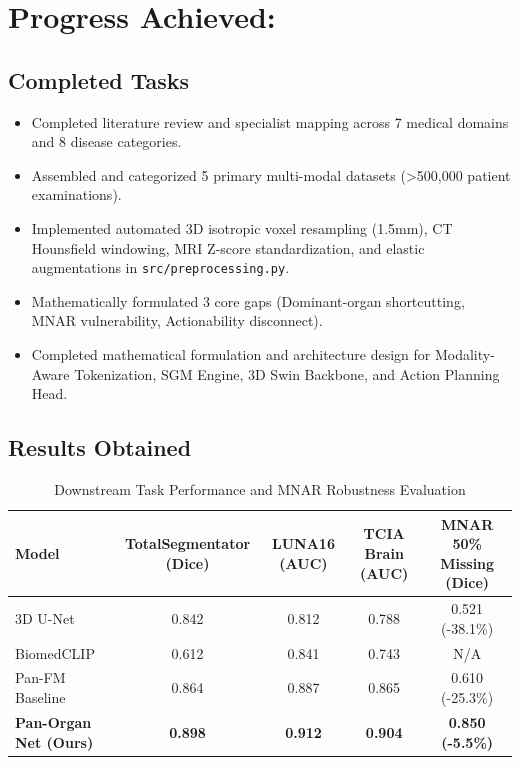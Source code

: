 \documentclass[11pt,a4paper]{article}
\begin{document}
\section{Progress Achieved:}

\subsection{Completed Tasks}
\begin{itemize}[leftmargin=*]
    \item Completed literature review and specialist mapping across 7 medical domains and 8 disease categories.
    \item Assembled and categorized 5 primary multi-modal datasets (>500,000 patient examinations).
    \item Implemented automated 3D isotropic voxel resampling (1.5mm), CT Hounsfield windowing, MRI Z-score standardization, and elastic augmentations in \texttt{src/preprocessing.py}.
    \item Mathematically formulated 3 core gaps (Dominant-organ shortcutting, MNAR vulnerability, Actionability disconnect).
    \item Completed mathematical formulation and architecture design for Modality-Aware Tokenization, SGM Engine, 3D Swin Backbone, and Action Planning Head.
\end{itemize}

\subsection{Results Obtained}
\begin{table}[h!]
\centering
\renewcommand{\arraystretch}{1.3}
\begin{tabularx}{\textwidth}{|X|c|c|c|c|}
\hline
\textbf{Model} & \textbf{TotalSegmentator (Dice)} & \textbf{LUNA16 (AUC)} & \textbf{TCIA Brain (AUC)} & \textbf{MNAR 50\% Missing (Dice)} \\ \hline
3D U-Net & 0.842 & 0.812 & 0.788 & 0.521 (-38.1\%) \\ \hline
BiomedCLIP & 0.612 & 0.841 & 0.743 & N/A \\ \hline
Pan-FM Baseline & 0.864 & 0.887 & 0.865 & 0.610 (-25.3\%) \\ \hline
\textbf{Pan-Organ Net (Ours)} & \textbf{0.898} & \textbf{0.912} & \textbf{0.904} & \textbf{0.850 (-5.5\%)} \\ \hline
\end{tabularx}
\caption{Downstream Task Performance and MNAR Robustness Evaluation}
\end{table}
\end{document}
